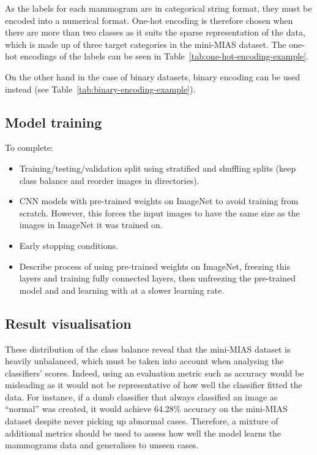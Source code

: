 As the labels for each mammogram are in categorical string format, they must be encoded into a numerical format. One-hot encoding is therefore chosen when there are more than two  classes as it suits the sparse representation of the data, which is made up of three target categories in the mini-MIAS dataset. The one-hot encodings of the labels can be seen in Table~\ref{tab:one-hot-encoding-example}.



On the other hand in the case of binary datasets, binary encoding can be used instead (see Table~\ref{tab:binary-encoding-example}).




\subsection{Model training}

To complete:
\begin{itemize}
    \item Training/testing/validation split using stratified and shuffling splits (keep class balance and reorder images in directories).
    \item CNN models with pre-trained weights on ImageNet to avoid training from scratch. However, this  forces the input images to have the same size as the images in ImageNet it was trained on.
    \item Early stopping conditions.
    \item Describe process of using pre-trained weights on ImageNet, freezing this layers and training fully connected layers, then unfreezing the pre-trained model and and learning with at a slower learning rate.
\end{itemize}


\subsection{Result visualisation}
\label{sec:design-results-visualisation}

These distribution of the class balance reveal that the mini-MIAS dataset is heavily unbalanced, which must be taken into account when analysing the classifiers' scores. Indeed, using an  evaluation metric such as accuracy would be misleading as it would not be representative of how well the classifier fitted the data. For instance, if a dumb classifier that always classified an image as ``normal'' was created, it would achieve 64.28\% accuracy on the mini-MIAS dataset despite  never picking up abnormal cases. Therefore, a mixture of additional metrics should be used to assess how well the model learns the mammograms data and generalises to unseen cases.


